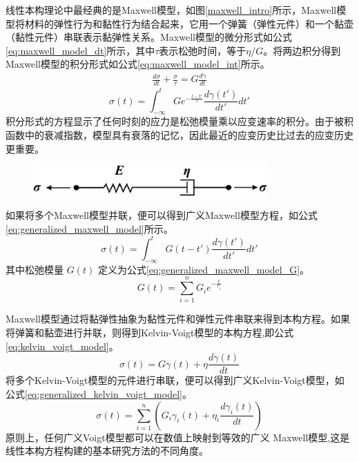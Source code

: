 线性本构理论中最经典的是Maxwell模型\cite{maxwell1867iv}，如图\ref{maxwell_intro}所示，Maxwell模型将材料的弹性行为和黏性行为结合起来，它用一个弹簧（弹性元件）和一个黏壶（黏性元件）串联表示黏弹性关系。Maxwell模型的微分形式如公式\eqref{eq:maxwell_model_dt}所示，其中$\tau$表示松弛时间，等于$\eta/G$。将两边积分得到Maxwell模型的积分形式如公式\eqref{eq:maxwell_model_int}所示。
\begin{gather}
  \frac{d\sigma}{dt} + \frac{\sigma}{\tau}  = G \frac{d\gamma}{dt} \label{eq:maxwell_model_dt}
\end{gather}
\begin{equation}
  \sigma(t)                                = \int_{-\infty}^{t} G e^{-\frac{t-t'}{\tau}} \frac{d\gamma(t')}{dt'} dt'\label{eq:maxwell_model_int}
\end{equation}
积分形式的方程显示了任何时刻的应力是松弛模量乘以应变速率的积分。由于被积函数中的衰减指数，模型具有衰落的记忆，因此最近的应变历史比过去的应变历史更重要。
\begin{figure}[htbp]
  \centering
  \includegraphics[width=0.8\textwidth]{Fig/maxwell_intro.png}
\end{figure}
如果将多个Maxwell模型并联，便可以得到广义Maxwell模型方程，如公式\eqref{eq:generalized_maxwell_model}所示。
\begin{equation}
  \sigma(t) = \int_{-\infty}^{t} G(t-t') \frac{d\gamma(t')}{dt'} dt' \label{eq:generalized_maxwell_model}
\end{equation}
其中松弛模量 \(G(t)\) 定义为公式\eqref{eq:generalized_maxwell_model_G}。
\begin{equation}
  G(t) = \sum_{i=1}^{n} G_i e^{-\frac{t}{\tau_i}} \label{eq:generalized_maxwell_model_G}
\end{equation}

Maxwell模型通过将黏弹性抽象为黏性元件和弹性元件串联来得到本构方程。如果将弹簧和黏壶进行并联，则得到Kelvin-Voigt模型的本构方程,即公式\eqref{eq:kelvin_voigt_model}\cite{voigt1892ueber}。
\begin{equation}
  \sigma(t) = G \gamma(t) + \eta \frac{d\gamma(t)}{dt} \label{eq:kelvin_voigt_model}
\end{equation}
将多个Kelvin-Voigt模型的元件进行串联，便可以得到广义Kelvin-Voigt模型，如公式\eqref{eq:generalized_kelvin_voigt_model}。
\begin{equation}
  \sigma(t) = \sum_{i=1}^{n} \left( G_i \gamma_i(t) + \eta_i \frac{d\gamma_i(t)}{dt} \right)\label{eq:generalized_kelvin_voigt_model}
\end{equation}
原则上，任何广义Voigt模型都可以在数值上映射到等效的广义 Maxwell模型,这是线性本构方程构建的基本研究方法的不同角度\cite{ricarteTutorialReviewLinear2024}。

